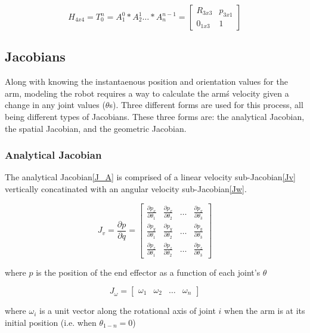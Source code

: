 \documentclass[10pt,journal]{IEEEtran}
\begin{document}
\begin{equation}\label{T_Matrix}
	H_{4x4}=T_0^n = A_1^0*A_2^1 \dots*A_n^{n-1} = 
		\begin{bmatrix}
			R_{3x3} & p_{3x1} \\
			0_{1x3} & 1
		\end{bmatrix}
\end{equation}

\subsection{Jacobians}
Along with knowing the instantaenous position and orientation
values for the arm, modeling the robot requires a way
to calculate the arm\'s velocity given a change in any joint
values ($\theta$s). Three different forms are used for this process,
all being different types of Jacobians. These three forms are:
the analytical Jacobian, the spatial Jacobian, and the geometric
Jacobian.

\subsubsection{Analytical Jacobian}
The analytical Jacobian\ref{J_A} is comprised of a linear velocity sub-Jacobian\ref{Jv} vertically concatinated with an angular velocity sub-Jacobian\ref{Jw}.

\begin{mycapequ}[!ht]
\begin{equation}\label{Jv}
J_v = \frac{\partial p}{\partial q} = \begin{bmatrix} 
\frac{\partial p_x}{\partial \theta_1} & \frac{\partial p_x}{\partial \theta_2} & \dots & \frac{\partial p_x}{\partial \theta_3} \\
\frac{\partial p_y}{\partial \theta_1} & \frac{\partial p_y}{\partial \theta_2} & \dots & \frac{\partial p_y}{\partial \theta_3} \\
\frac{\partial p_z}{\partial \theta_1} & \frac{\partial p_z}{\partial \theta_2} & \dots & \frac{\partial p_z}{\partial \theta_3}
		\end{bmatrix} 
\end{equation}
\caption{where $p$ is the position of the end effector as a function of each joint's $\theta$}
\end{mycapequ}

\begin{mycapequ}[!ht]
\begin{equation}\label{Jw}
	J_\omega = 
		\begin{bmatrix} 
			\omega_1 & \omega_2 & \dots & \omega_n 
		\end{bmatrix} 
\end{equation}
\caption{where $\omega_i$ is a unit vector along the rotational axis of joint $i$ when the arm is at its initial position (i.e. when $\theta_{1-n}=0$)}
\end{mycapequ}
\end{document}

